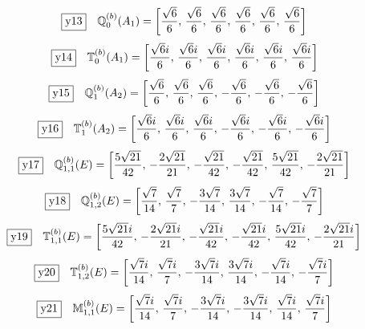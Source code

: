\documentclass[fleqn,10pt,landscape]{jsarticle}
\begin{document}
\begin{dmath*}
\fbox{y13}\quad \mathbb{Q}_{0}^{(b)}(A_{1})=\left[ \frac{\sqrt{6}}{6},\, \frac{\sqrt{6}}{6},\, \frac{\sqrt{6}}{6},\, \frac{\sqrt{6}}{6},\, \frac{\sqrt{6}}{6},\, \frac{\sqrt{6}}{6} \right]
\end{dmath*}
\begin{dmath*}
\fbox{y14}\quad \mathbb{T}_{0}^{(b)}(A_{1})=\left[ \frac{\sqrt{6} i}{6},\, \frac{\sqrt{6} i}{6},\, \frac{\sqrt{6} i}{6},\, \frac{\sqrt{6} i}{6},\, \frac{\sqrt{6} i}{6},\, \frac{\sqrt{6} i}{6} \right]
\end{dmath*}
\begin{dmath*}
\fbox{y15}\quad \mathbb{Q}_{1}^{(b)}(A_{2})=\left[ \frac{\sqrt{6}}{6},\, \frac{\sqrt{6}}{6},\, \frac{\sqrt{6}}{6},\, - \frac{\sqrt{6}}{6},\, - \frac{\sqrt{6}}{6},\, - \frac{\sqrt{6}}{6} \right]
\end{dmath*}
\begin{dmath*}
\fbox{y16}\quad \mathbb{T}_{1}^{(b)}(A_{2})=\left[ \frac{\sqrt{6} i}{6},\, \frac{\sqrt{6} i}{6},\, \frac{\sqrt{6} i}{6},\, - \frac{\sqrt{6} i}{6},\, - \frac{\sqrt{6} i}{6},\, - \frac{\sqrt{6} i}{6} \right]
\end{dmath*}
\begin{dmath*}
\fbox{y17}\quad \mathbb{Q}_{1,1}^{(b)}(E)=\left[ \frac{5 \sqrt{21}}{42},\, - \frac{2 \sqrt{21}}{21},\, - \frac{\sqrt{21}}{42},\, - \frac{\sqrt{21}}{42},\, \frac{5 \sqrt{21}}{42},\, - \frac{2 \sqrt{21}}{21} \right]
\end{dmath*}
\begin{dmath*}
\fbox{y18}\quad \mathbb{Q}_{1,2}^{(b)}(E)=\left[ \frac{\sqrt{7}}{14},\, \frac{\sqrt{7}}{7},\, - \frac{3 \sqrt{7}}{14},\, \frac{3 \sqrt{7}}{14},\, - \frac{\sqrt{7}}{14},\, - \frac{\sqrt{7}}{7} \right]
\end{dmath*}
\begin{dmath*}
\fbox{y19}\quad \mathbb{T}_{1,1}^{(b)}(E)=\left[ \frac{5 \sqrt{21} i}{42},\, - \frac{2 \sqrt{21} i}{21},\, - \frac{\sqrt{21} i}{42},\, - \frac{\sqrt{21} i}{42},\, \frac{5 \sqrt{21} i}{42},\, - \frac{2 \sqrt{21} i}{21} \right]
\end{dmath*}
\begin{dmath*}
\fbox{y20}\quad \mathbb{T}_{1,2}^{(b)}(E)=\left[ \frac{\sqrt{7} i}{14},\, \frac{\sqrt{7} i}{7},\, - \frac{3 \sqrt{7} i}{14},\, \frac{3 \sqrt{7} i}{14},\, - \frac{\sqrt{7} i}{14},\, - \frac{\sqrt{7} i}{7} \right]
\end{dmath*}
\begin{dmath*}
\fbox{y21}\quad \mathbb{M}_{1,1}^{(b)}(E)=\left[ \frac{\sqrt{7} i}{14},\, \frac{\sqrt{7} i}{7},\, - \frac{3 \sqrt{7} i}{14},\, - \frac{3 \sqrt{7} i}{14},\, \frac{\sqrt{7} i}{14},\, \frac{\sqrt{7} i}{7} \right]
\end{dmath*}
\end{document}
